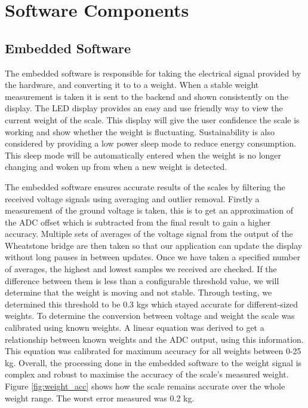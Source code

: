 
\chapter{Software Components}

\section{Embedded Software}
The embedded software is responsible for taking the electrical signal provided by the hardware, and converting it to to a weight. When a stable weight measurement is taken it is  sent to the backend and shown consistently on the display. The LED display provides an easy and use friendly way to view the current weight of the scale. This display will give the user confidence the scale is working and show whether the weight is fluctuating. Sustainability is also considered by providing a low power sleep mode to reduce energy consumption. This sleep mode will be automatically entered when the weight is no longer changing and woken up from when a new weight is detected. 

The embedded software ensures accurate results of the scales by filtering the received voltage signals using averaging and outlier removal. Firstly a measurement of the ground voltage is taken, this is to get an approximation of the ADC offset which is subtracted from the final result to gain a higher accuracy. Multiple sets of averages of the voltage signal from the output of the Wheatstone bridge are then taken so that our application can update the display without long pauses in between updates. Once we have taken a specified number of averages, the highest and lowest samples we received are checked. If the difference between them is less than a configurable threshold value, we will determine that the weight is moving and not stable. Through testing, we determined this threshold to be 0.3 kgs which stayed accurate for different-sized weights. To determine the conversion between voltage and weight the scale was calibrated using known weights. A linear equation was derived to get a relationship between known weights and the ADC output, using this information. This equation was calibrated for maximum accuracy for all weights between 0-25 kg. Overall, the processing done in the embedded software to the weight signal is complex and robust to maximise the accuracy of the scale’s measured weight. Figure  \ref{fig:weight_acc} shows how the scale remains accurate over the whole weight range. The worst error measured was 0.2 kg. 

